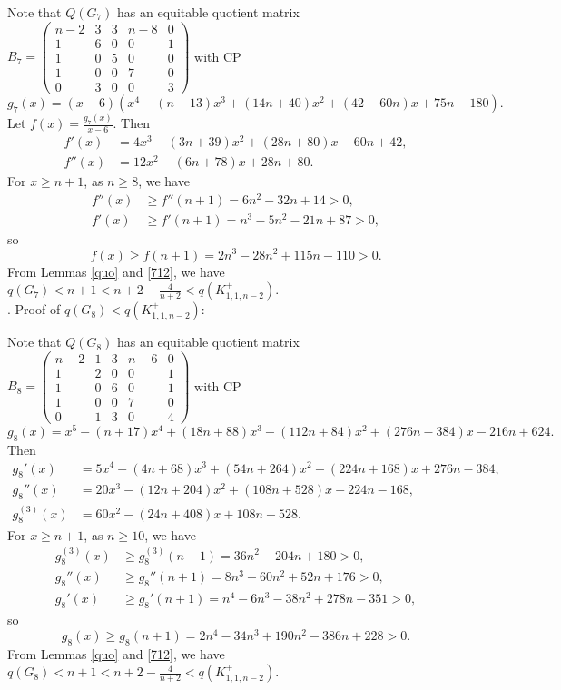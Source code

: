 \documentclass[12pt]{article}
\begin{document}
\begin{appendices}
Note that $Q(G_{7})$ has an equitable quotient matrix
$B_{7}=
\left(\begin{smallmatrix}
n-2 & 3 & 3 & n-8 & 0\\
1 &6 &0 &0 &1\\
1 &0 &5 &0 &0\\
1 &0 &0 &7 &0\\
0 &3 &0 &0 &3
\end{smallmatrix}\right)$
with CP
\[
g_{7}(x)=(x-6)\left(x^4 - ( n + 13)x^3 + (14n + 40)x^2 + (42 - 60n)x + 75n - 180\right).
\]
Let  $f(x)=\frac{g_7(x)}{x-6}$.
Then
\begin{align*}
f'(x)&=4x^3 - (3n + 39)x^2 + (28n + 80)x - 60n + 42,\\
f''(x)&=12x^2 - ( 6n + 78)x + 28n + 80.
\end{align*}
For  $x\ge n+1$, as $n\ge 8$, we have
\begin{align*}
f''(x)&\ge f''(n+1)=6n^2 - 32n + 14>0,\\
f'(x)&\ge f'(n+1)=n^3 - 5n^2 - 21n + 87>0,
\end{align*}
so
\[
f(x)\ge f(n+1)=2n^3 - 28n^2 + 115n - 110>0.
\]
From Lemmas \ref{quo} and \ref{712}, we have $q(G_{7})<n+1<n+2-\frac{4}{n+2}<q(K_{1,1,n-2}^+)$.\\

. Proof of $q(G_{8})<q(K_{1,1,n-2}^+)$:

Note that $Q(G_{8})$ has an equitable quotient matrix
$
B_{8}=
\left(\begin{smallmatrix}
n-2 & 1 & 3 & n-6 & 0\\
1 &2 &0 &0 &1\\
1 &0 &6 &0 &1\\
1 &0 &0 &7 &0\\
0 &1 &3 &0 &4
\end{smallmatrix}\right)$
with CP
\[
g_{8}(x)=x^5 -( n + 17)x^4 + (18n + 88)x^3 - ( 112n + 84)x^2 + (276n - 384)x - 216n + 624.
\]
Then
\begin{align*}
g_{8}'(x)&=5x^4 - ( 4n + 68)x^3 + (54n + 264)x^2 - ( 224n + 168)x + 276n - 384,\\
g_{8}''(x)&=20x^3 - ( 12n + 204)x^2 + (108n + 528)x - 224n - 168,\\
g_{8}^{(3)}(x)&=60x^2 - ( 24n + 408)x + 108n + 528.
\end{align*}
For  $x\ge n+1$, as $n\ge 10$, we have
\begin{align*}
g_{8}^{(3)}(x)&\ge g_{8}^{(3)}(n+1)=36n^2 - 204n + 180>0,\\
g_{8}''(x)&\ge g_{8}''(n+1)=8n^3 - 60n^2 + 52n + 176>0,\\
g_{8}'(x)&\ge g_{8}'(n+1)=n^4 - 6n^3 - 38n^2 + 278n - 351>0,
\end{align*}
so
\[
g_{8}(x)\ge g_{8}(n+1)=2n^4 - 34n^3 + 190n^2 - 386n + 228>0.
\]
From Lemmas \ref{quo} and \ref{712}, we have $q(G_{8})<n+1<n+2-\frac{4}{n+2}<q(K_{1,1,n-2}^+)$.\\



\end{appendices}
\end{document}
